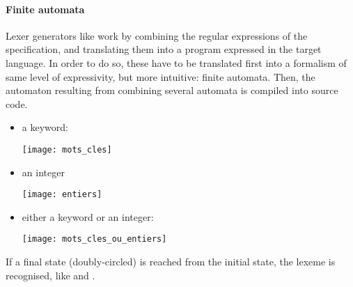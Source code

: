 \documentclass[12pt,a4paper]{article}
\begin{document}
\paragraph{Finite automata}

Lexer generators like \ocamllex work by combining the regular
expressions of the specification, and translating them into a program
expressed in the target language. In order to do so, these have to be
translated first into a formalism of same level of expressivity, but
more intuitive: finite automata. Then, the automaton resulting from
combining several automata is compiled into source code.
\begin{itemize}

   \item a keyword:
     \begin{center}
       \texttt{[image: mots\_cles]}
     \end{center}

  \item an integer
    \begin{center}
      \texttt{[image: entiers]}
    \end{center}

  \item either a keyword or an integer:
    \begin{center}
      \texttt{[image: mots\_cles\_ou\_entiers]}
    \end{center}

\end{itemize}
If a final state (doubly\hyp{}circled) is reached from the initial
state, the lexeme is recognised, like \Tlet and \Tint.
\end{document}
